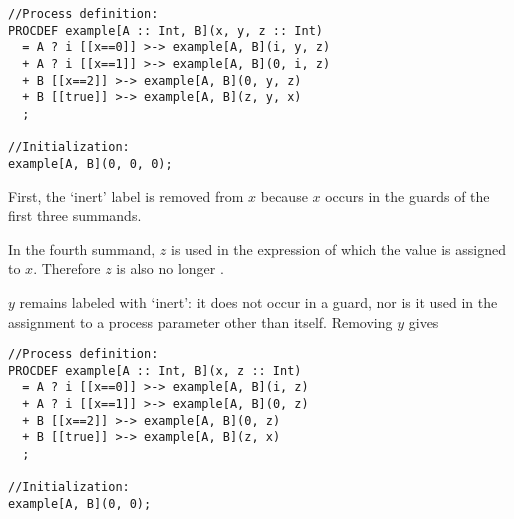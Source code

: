 \begin{lstlisting}
//Process definition:
PROCDEF example[A :: Int, B](x, y, z :: Int)
  = A ? i [[x==0]] >-> example[A, B](i, y, z)
  + A ? i [[x==1]] >-> example[A, B](0, i, z)
  + B [[x==2]] >-> example[A, B](0, y, z)
  + B [[true]] >-> example[A, B](z, y, x)
  ;

//Initialization:
example[A, B](0, 0, 0);
\end{lstlisting}

First, the `inert' label is removed from $x$ because $x$ occurs in the guards of the first three summands.

In the fourth summand, $z$ is used in the expression of which the value is assigned to $x$.
Therefore $z$ is also no longer .

$y$ remains labeled with `inert': it does not occur in a guard, nor is it used in the assignment to a process parameter other than itself.
Removing $y$ gives

\begin{lstlisting}
//Process definition:
PROCDEF example[A :: Int, B](x, z :: Int)
  = A ? i [[x==0]] >-> example[A, B](i, z)
  + A ? i [[x==1]] >-> example[A, B](0, z)
  + B [[x==2]] >-> example[A, B](0, z)
  + B [[true]] >-> example[A, B](z, x)
  ;

//Initialization:
example[A, B](0, 0);
\end{lstlisting}



